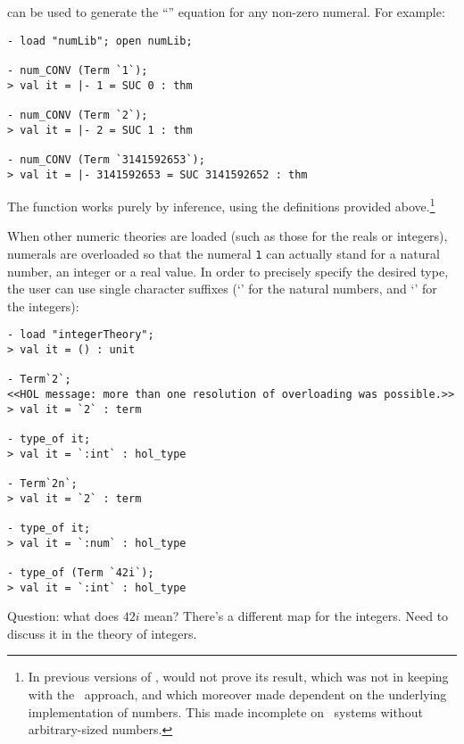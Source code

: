 \noindent {} can be used to generate the ``''
equation for any non-zero numeral.  For example:

\setcounter{sessioncount}{1}
\begin{session}\begin{verbatim}
- load "numLib"; open numLib;

- num_CONV (Term `1`);
> val it = |- 1 = SUC 0 : thm

- num_CONV (Term `2`);
> val it = |- 2 = SUC 1 : thm

- num_CONV (Term `3141592653`);
> val it = |- 3141592653 = SUC 3141592652 : thm
\end{verbatim}\end{session}

\noindent The  function works purely by inference, using
the definitions provided above.\footnote{In previous versions of \HOL,
 would not prove its result, which was not in keeping with
the \LCF\ approach, and which moreover made  dependent on
the underlying implementation of numbers. This made 
incomplete on \ML\ systems without arbitrary-sized numbers.}

When other numeric theories are loaded (such as those for the reals or
integers), numerals are overloaded so that the numeral {\small\verb+1+} can
actually stand for a natural number, an integer or a real value.  In
order to precisely specify the desired type, the user can use single
character suffixes (`' for the natural numbers, and `' for
the integers): 

\begin{session}
\begin{verbatim}
- load "integerTheory";
> val it = () : unit

- Term`2`;
<<HOL message: more than one resolution of overloading was possible.>>
> val it = `2` : term

- type_of it;
> val it = `:int` : hol_type

- Term`2n`;
> val it = `2` : term

- type_of it;
> val it = `:num` : hol_type

- type_of (Term `42i`);
> val it = `:int` : hol_type
\end{verbatim}\end{session}

Question: what does $42i$ mean? There's a different map for the
integers. Need to discuss it in the theory of integers.

